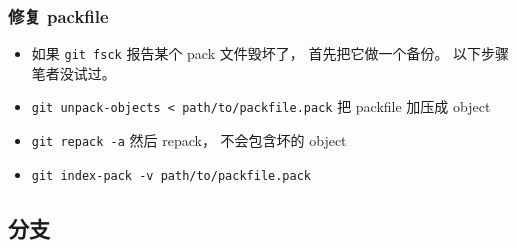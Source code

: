 \subsubsection{修复 packfile}
\begin{itemize}
\item 如果 \verb|git fsck| 报告某个 pack 文件毁坏了， 首先把它做一个备份。 以下步骤笔者没试过。
\item \verb|git unpack-objects < path/to/packfile.pack| 把 packfile 加压成 object
\item \verb|git repack -a| 然后 repack， 不会包含坏的 object
\item \verb|git index-pack -v path/to/packfile.pack| 
\end{itemize}


\subsection{分支}

